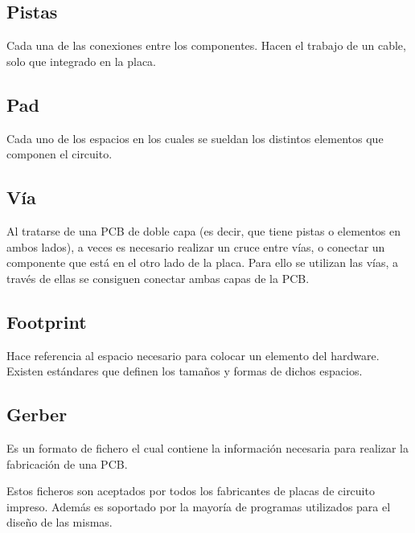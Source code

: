 \subsection{Pistas}\label{pistas}

Cada una de las conexiones entre los componentes. Hacen el trabajo de un cable, solo que integrado en la placa.


\subsection{Pad}\label{pad}

Cada uno de los espacios en los cuales se sueldan los distintos  elementos que componen el circuito.


\subsection{Vía}\label{via}

Al tratarse de una PCB de doble capa (es decir, que tiene pistas o elementos en ambos lados), a veces es necesario realizar un cruce entre vías, o conectar un componente que está en el otro lado de la placa. Para ello se utilizan las vías, a través de ellas se consiguen conectar ambas capas de la PCB.


\subsection{Footprint}\label{footprint}

Hace referencia al espacio necesario para colocar un elemento del hardware. Existen estándares que definen los tamaños y formas de dichos espacios.


\subsection{Gerber}\label{gerber}
Es un formato de fichero el cual contiene la información necesaria para realizar la fabricación de una PCB.

Estos ficheros son aceptados por todos los fabricantes de placas de circuito impreso. Además es soportado por la mayoría de programas utilizados para el diseño de las mismas.

